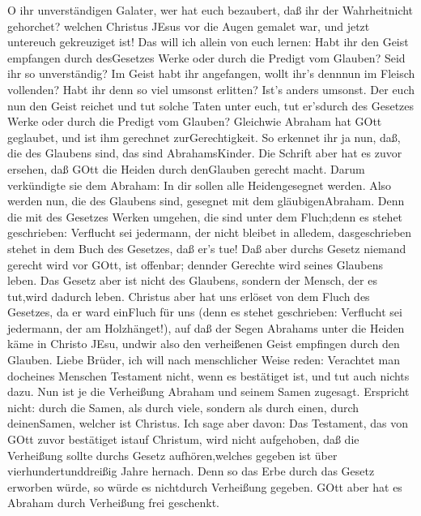  O ihr unverständigen Galater, wer hat euch bezaubert, daß
ihr der Wahrheitnicht gehorchet? welchen Christus JEsus vor die Augen
gemalet war, und jetzt untereuch gekreuziget ist!  Das will
ich allein von euch lernen: Habt ihr den Geist empfangen durch
desGesetzes Werke oder durch die Predigt vom Glauben?  Seid
ihr so unverständig? Im Geist habt ihr angefangen, wollt ihr's dennnun
im Fleisch vollenden?  Habt ihr denn so viel umsonst
erlitten? Ist's anders umsonst.  Der euch nun den Geist
reichet und tut solche Taten unter euch, tut er'sdurch des Gesetzes
Werke oder durch die Predigt vom Glauben?  Gleichwie Abraham
hat GOtt geglaubet, und ist ihm gerechnet zurGerechtigkeit. 
So erkennet ihr ja nun, daß, die des Glaubens sind, das sind
AbrahamsKinder.  Die Schrift aber hat es zuvor ersehen, daß
GOtt die Heiden durch denGlauben gerecht macht. Darum verkündigte sie
dem Abraham: In dir sollen alle Heidengesegnet werden.  Also
werden nun, die des Glaubens sind, gesegnet mit dem gläubigenAbraham.
 Denn die mit des Gesetzes Werken umgehen, die sind unter
dem Fluch;denn es stehet geschrieben: Verflucht sei jedermann, der nicht
bleibet in alledem, dasgeschrieben stehet in dem Buch des Gesetzes, daß
er's tue!  Daß aber durchs Gesetz niemand gerecht wird vor
GOtt, ist offenbar; dennder Gerechte wird seines Glaubens leben.
 Das Gesetz aber ist nicht des Glaubens, sondern der
Mensch, der es tut,wird dadurch leben.  Christus aber hat
uns erlöset von dem Fluch des Gesetzes, da er ward einFluch für uns
(denn es stehet geschrieben: Verflucht sei jedermann, der am
Holzhänget!),  auf daß der Segen Abrahams unter die Heiden
käme in Christo JEsu, undwir also den verheißenen Geist empfingen durch
den Glauben.  Liebe Brüder, ich will nach menschlicher
Weise reden: Verachtet man docheines Menschen Testament nicht, wenn es
bestätiget ist, und tut auch nichts dazu.  Nun ist je die
Verheißung Abraham und seinem Samen zugesagt. Erspricht nicht: durch die
Samen, als durch viele, sondern als durch einen, durch deinenSamen,
welcher ist Christus.  Ich sage aber davon: Das Testament,
das von GOtt zuvor bestätiget istauf Christum, wird nicht aufgehoben,
daß die Verheißung sollte durchs Gesetz aufhören,welches gegeben ist
über vierhundertunddreißig Jahre hernach.  Denn so das Erbe
durch das Gesetz erworben würde, so würde es nichtdurch Verheißung
gegeben. GOtt aber hat es Abraham durch Verheißung frei geschenkt.
